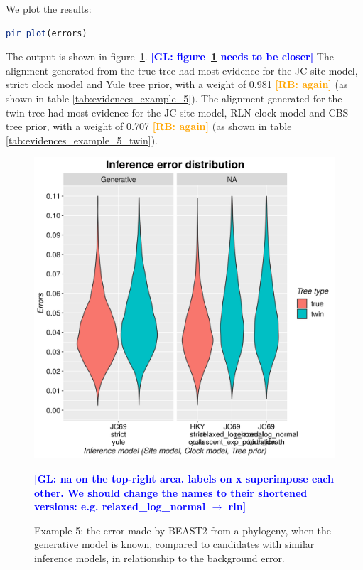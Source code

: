 \documentclass{article}
\newcommand{\giovanni}[1]{\textcolor{blue}{\textbf{[GL: #1]}}}
\newcommand{\richel}[1]{\textcolor{orange}{\textbf{[RB: #1]}}}
\begin{document}
We plot the results:

\begin{lstlisting}[language=R, floatplacement=H, frame=single]
pir_plot(errors)
\end{lstlisting}

The output is shown in figure~\ref{fig:example_5}.
\giovanni{figure~\ref{fig:example_5} needs to be closer}
The alignment
generated from the true tree had most evidence for the JC site model,
strict clock model and Yule tree prior, 
with a weight of 0.981 \richel{again} (as 
shown in table \ref{tab:evidences_example_5}). 
The alignment
generated for the twin tree had most evidence for the JC site model,
RLN clock model and CBS tree prior,
with a weight of 0.707 \richel{again} (as 
shown in table \ref{tab:evidences_example_5_twin}). 

\begin{figure}[ht]
  \includegraphics[width=\textwidth]{example_5/errors.png}
  \caption{
    Example 5: the error made by BEAST2 from a phylogeny, 
    when the generative model is known, 
    compared to candidates with similar inference models, 
    in relationship to the background error.
  }
  \giovanni{na on the top-right area. labels on x superimpose each other. We should change the names to their shortened versions: e.g. relaxed\_log\_normal $\to$ rln}
  \label{fig:example_5}
\end{figure}
\end{document}
